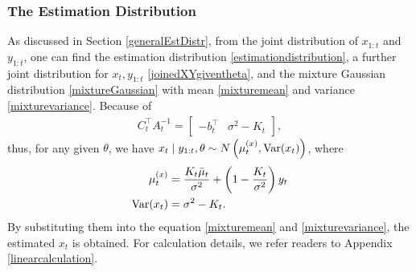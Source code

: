 \subsubsection*{The Estimation Distribution}



As discussed in Section \ref{generalEstDistr}, from the joint distribution of $x_{1:t}$ and $y_{1:t}$, one can find the estimation distribution \eqref{estimationdistribution}, a further joint distribution for $x_t,y_{1:t}$ \eqref{joinedXYgiventheta}, and the mixture Gaussian distribution \eqref{mixtureGaussian} with mean \eqref{mixturemean} and variance \eqref{mixturevariance}. Because of 
\begin{align}
C_{t}^\top A_{t}^{-1} = \begin{bmatrix} - b_{t}^\top & \sigma^2- K_{t} \end{bmatrix},
\end{align}
thus, for any given $\theta$, we have $x_{t}\mid y_{1:t},\theta \sim N\left( \mu_{t}^{(x)},\mathrm{Var}(x_t) \right)$, where
\begin{align}
\mu_{t}^{(x)} &  =  \frac{K_{t}\bar{\mu}_{t}}{\sigma^2}+\left(1-\frac{K_{t}}{\sigma^2}\right)y_{t} \\
\mathrm{Var}(x_t)&= \sigma^2-K_{t}.
\end{align}
By substituting them into the equation \eqref{mixturemean} and \eqref{mixturevariance}, the estimated $x_t$ is obtained. For calculation details, we refer readers to Appendix \ref{linearcalculation}.


